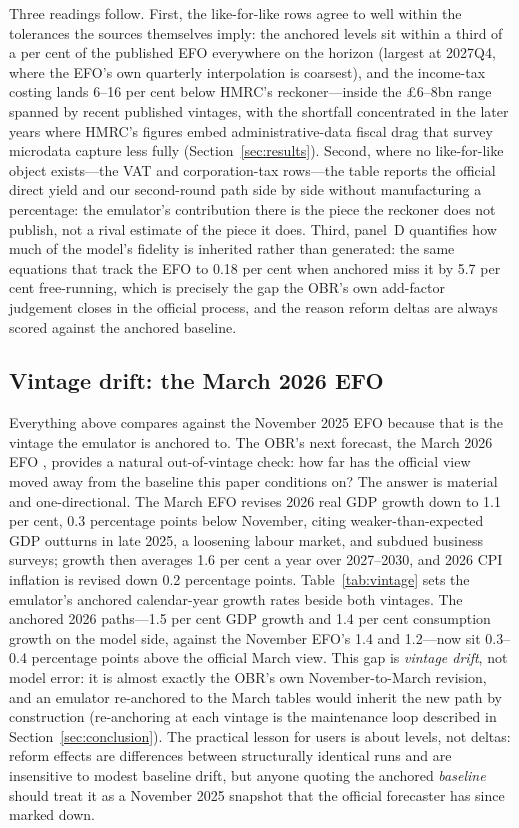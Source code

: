Three readings follow. First, the like-for-like rows agree to well within the tolerances the sources themselves imply: the anchored levels sit within a third of a per cent of the published EFO everywhere on the horizon (largest at 2027Q4, where the EFO's own quarterly interpolation is coarsest), and the income-tax costing lands 6--16 per cent below HMRC's reckoner---inside the \pounds 6--8bn range spanned by recent published vintages, with the shortfall concentrated in the later years where HMRC's figures embed administrative-data fiscal drag that survey microdata capture less fully (Section~\ref{sec:results}). Second, where no like-for-like object exists---the VAT and corporation-tax rows---the table reports the official direct yield and our second-round path side by side without manufacturing a percentage: the emulator's contribution there is the piece the reckoner does not publish, not a rival estimate of the piece it does. Third, panel~D quantifies how much of the model's fidelity is inherited rather than generated: the same equations that track the EFO to 0.18 per cent when anchored miss it by 5.7 per cent free-running, which is precisely the gap the OBR's own add-factor judgement closes in the official process, and the reason reform deltas are always scored against the anchored baseline.

\subsection{Vintage drift: the March 2026 EFO}
\label{sec:vintagedrift}

Everything above compares against the November 2025 EFO because that is the vintage the emulator is anchored to. The OBR's next forecast, the March 2026 EFO \citep{obr2026efo}, provides a natural out-of-vintage check: how far has the official view moved away from the baseline this paper conditions on? The answer is material and one-directional. The March EFO revises 2026 real GDP growth down to 1.1 per cent, 0.3 percentage points below November, citing weaker-than-expected GDP outturns in late 2025, a loosening labour market, and subdued business surveys; growth then averages 1.6 per cent a year over 2027--2030, and 2026 CPI inflation is revised down 0.2 percentage points. Table~\ref{tab:vintage} sets the emulator's anchored calendar-year growth rates beside both vintages. The anchored 2026 paths---1.5 per cent GDP growth and 1.4 per cent consumption growth on the model side, against the November EFO's 1.4 and 1.2---now sit 0.3--0.4 percentage points above the official March view. This gap is \emph{vintage drift}, not model error: it is almost exactly the OBR's own November-to-March revision, and an emulator re-anchored to the March tables would inherit the new path by construction (re-anchoring at each vintage is the maintenance loop described in Section~\ref{sec:conclusion}). The practical lesson for users is about levels, not deltas: reform effects are differences between structurally identical runs and are insensitive to modest baseline drift, but anyone quoting the anchored \emph{baseline} should treat it as a November 2025 snapshot that the official forecaster has since marked down.

